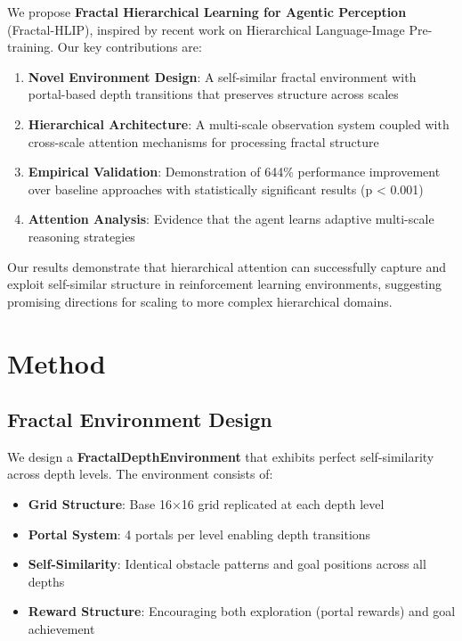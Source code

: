 \documentclass[11pt,a4paper]{article}
\begin{document}
We propose \textbf{Fractal Hierarchical Learning for Agentic Perception} (Fractal-HLIP), inspired by recent work on Hierarchical Language-Image Pre-training. Our key contributions are:

\begin{enumerate}
    \item \textbf{Novel Environment Design}: A self-similar fractal environment with portal-based depth transitions that preserves structure across scales
    \item \textbf{Hierarchical Architecture}: A multi-scale observation system coupled with cross-scale attention mechanisms for processing fractal structure
    \item \textbf{Empirical Validation}: Demonstration of 644\% performance improvement over baseline approaches with statistically significant results (p < 0.001)
    \item \textbf{Attention Analysis}: Evidence that the agent learns adaptive multi-scale reasoning strategies
\end{enumerate}

Our results demonstrate that hierarchical attention can successfully capture and exploit self-similar structure in reinforcement learning environments, suggesting promising directions for scaling to more complex hierarchical domains.

\section{Method}

\subsection{Fractal Environment Design}

We design a \textbf{FractalDepthEnvironment} that exhibits perfect self-similarity across depth levels. The environment consists of:

\begin{itemize}
    \item \textbf{Grid Structure}: Base 16×16 grid replicated at each depth level
    \item \textbf{Portal System}: 4 portals per level enabling depth transitions
    \item \textbf{Self-Similarity}: Identical obstacle patterns and goal positions across all depths
    \item \textbf{Reward Structure}: Encouraging both exploration (portal rewards) and goal achievement
\end{itemize}
\end{document}
